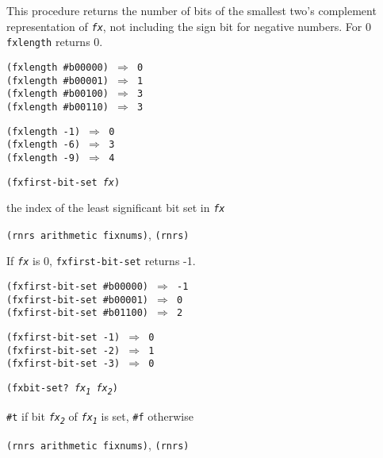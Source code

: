 This procedure returns the number of bits of the smallest two's
complement representation of \texttt{\textit{fx}}, not including the sign
bit for negative numbers.
For 0 \texttt{fxlength} returns 0.


\begin{alltt}
(fxlength \#{}b00000) \(\Rightarrow\) 0
(fxlength \#{}b00001) \(\Rightarrow\) 1
(fxlength \#{}b00100) \(\Rightarrow\) 3
(fxlength \#{}b00110) \(\Rightarrow\) 3

(fxlength -1) \(\Rightarrow\) 0
(fxlength -6) \(\Rightarrow\) 3
(fxlength -9) \(\Rightarrow\) 4
\end{alltt}

\begin{description}

\label{objects_s167}\item[procedure] \texttt{(fxfirst-bit-set \textit{fx})}



\item[returns] the index of the least significant bit set in \texttt{\textit{fx}}


\item[libraries] \texttt{(rnrs arithmetic fixnums)}, \texttt{(rnrs)}
\end{description}


If \texttt{\textit{fx}} is 0, \texttt{fxfirst-bit-set} returns -1.


\begin{alltt}
(fxfirst-bit-set \#{}b00000) \(\Rightarrow\) -1
(fxfirst-bit-set \#{}b00001) \(\Rightarrow\) 0
(fxfirst-bit-set \#{}b01100) \(\Rightarrow\) 2

(fxfirst-bit-set -1) \(\Rightarrow\) 0
(fxfirst-bit-set -2) \(\Rightarrow\) 1
(fxfirst-bit-set -3) \(\Rightarrow\) 0
\end{alltt}

\begin{description}

\label{objects_s168}\item[procedure] \texttt{(fxbit-set? \textit{fx\textsubscript{1}} \textit{fx\textsubscript{2}})}



\item[returns] \texttt{\#{}t} if bit \texttt{\textit{fx\textsubscript{2}}} of \texttt{\textit{fx\textsubscript{1}}} is set, \texttt{\#{}f} otherwise


\item[libraries] \texttt{(rnrs arithmetic fixnums)}, \texttt{(rnrs)}
\end{description}

